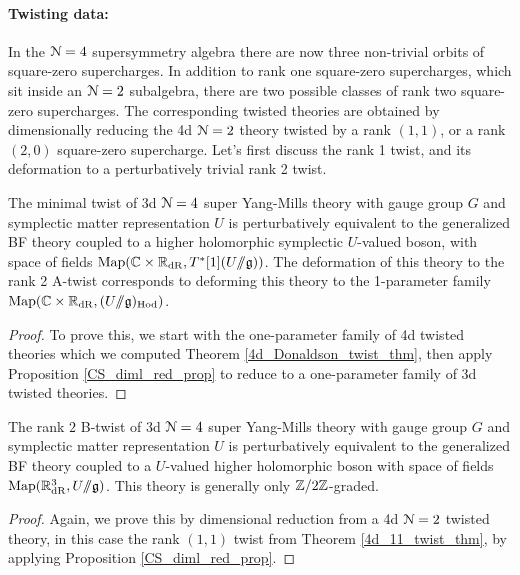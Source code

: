 \documentclass[10pt, oneside]{article}
\newcommand{\ham}{/\!\!/}
\begin{document}
\vspace{-10pt}
\paragraph{Twisting data:}
In the $\mathcal{N}=4$ supersymmetry algebra there are now three non-trivial orbits of square-zero supercharges.  In addition to rank one square-zero supercharges, which sit inside an $\mathcal{N}=2$ subalgebra, there are two possible classes of rank two square-zero supercharges.  The corresponding twisted theories are obtained by dimensionally reducing the 4d $\mathcal{N}=2$ theory twisted by a rank $(1,1)$, or a rank $(2,0)$ square-zero supercharge.  Let's first discuss the rank 1 twist, and its deformation to a perturbatively trivial rank 2 twist.

\begin{theorem} \label{3d_4_holo_A_twist_thm}
The minimal twist of 3d $\mathcal{N}=4$ super Yang-Mills theory with gauge group $G$ and symplectic matter representation $U$ is perturbatively equivalent to the generalized BF theory coupled to a higher holomorphic symplectic $U$-valued boson, with space of fields $\mr{Map}(\CC \times \RR_{\mr{dR}}, T^*[1](U\ham \gg))$. The deformation of this theory to the rank 2 A-twist corresponds to deforming this theory to the 1-parameter family $\mr{Map}(\CC \times \RR_{\mr{dR}}, (U\ham \gg)_{\mr{Hod}})$.
\end{theorem}

\begin{proof}
To prove this, we start with the one-parameter family of 4d twisted theories which we computed Theorem \ref{4d_Donaldson_twist_thm}, then apply Proposition \ref{CS_diml_red_prop} to reduce to a one-parameter family of 3d twisted theories.
\end{proof}

\begin{theorem} \label{3d_2_B_twist_thm}
The rank $2$ B-twist of 3d $\mathcal{N}=4$ super Yang-Mills theory with gauge group $G$ and symplectic matter representation $U$ is perturbatively equivalent to the generalized BF theory coupled to a $U$-valued higher holomorphic boson with space of fields $\mr{Map}(\RR^3_{\mr{dR}}, U\ham \gg)$.  This theory is generally only $\mathbb Z/2\mathbb Z$-graded.
\end{theorem}

\begin{proof}
Again, we prove this by dimensional reduction from a 4d $\mathcal{N}=2$ twisted theory, in this case the rank $(1,1)$ twist from Theorem \ref{4d_11_twist_thm}, by applying Proposition \ref{CS_diml_red_prop}.
\end{proof}
\end{document}
